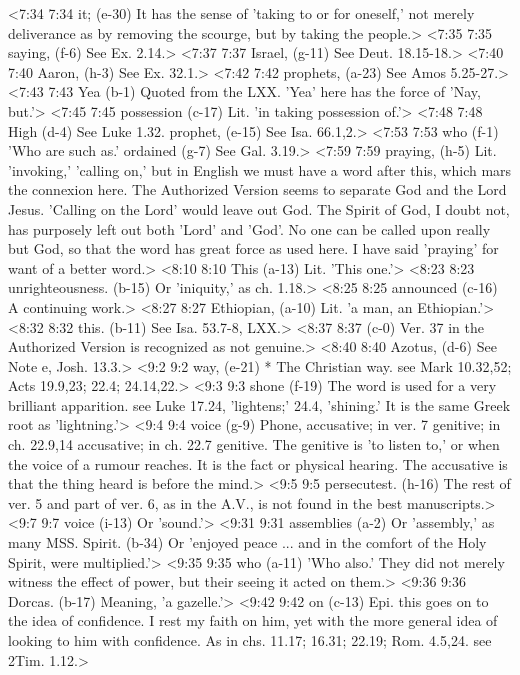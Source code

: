<7:34 7:34  it; (e-30)  It has the sense of 'taking to or for oneself,' not merely  deliverance as by removing the scourge, but by taking the  people.>
<7:35 7:35  saying, (f-6)  See Ex. 2.14.>
<7:37 7:37  Israel, (g-11)  See Deut. 18.15-18.>
<7:40 7:40  Aaron, (h-3)  See Ex. 32.1.>
<7:42 7:42  prophets, (a-23)  See Amos 5.25-27.>
<7:43 7:43  Yea  (b-1)  Quoted from the LXX. 'Yea' here has the force of 'Nay, but.'>
<7:45 7:45  possession (c-17)  Lit. 'in taking possession of.'>
<7:48 7:48  High (d-4)  See Luke 1.32.
  prophet, (e-15)  See Isa. 66.1,2.>
<7:53 7:53  who (f-1)  'Who are such as.'
  ordained (g-7)  See Gal. 3.19.>
<7:59 7:59  praying, (h-5)  Lit. 'invoking,' 'calling on,' but in English we must have a  word after this, which mars the connexion here. The Authorized  Version seems to separate God and the Lord Jesus. 'Calling on  the Lord' would leave out God. The Spirit of God, I doubt not,  has purposely left out both 'Lord' and 'God'. No one can be  called upon really but God, so that the word has great force as  used here. I have said 'praying' for want of a better word.>
<8:10 8:10  This (a-13)  Lit. 'This one.'>
<8:23 8:23  unrighteousness. (b-15)  Or 'iniquity,' as ch. 1.18.>
<8:25 8:25  announced (c-16)  A continuing work.>
<8:27 8:27  Ethiopian, (a-10)  Lit. 'a man, an Ethiopian.'>
<8:32 8:32  this. (b-11)  See Isa. 53.7-8, LXX.>
<8:37 8:37   (c-0)  Ver. 37 in the Authorized Version is recognized as not  genuine.>
<8:40 8:40  Azotus, (d-6)  See Note e, Josh. 13.3.>
<9:2 9:2  way, (e-21)  * The Christian way. see Mark 10.32,52; Acts 19.9,23; 22.4; 24.14,22.>
<9:3 9:3  shone (f-19)  The word is used for a very brilliant apparition. see Luke  17.24, 'lightens;' 24.4, 'shining.' It is the same Greek root  as 'lightning.'>
<9:4 9:4  voice (g-9)  Phone, accusative; in ver. 7 genitive; in ch. 22.9,14  accusative; in ch. 22.7 genitive. The genitive is 'to listen  to,' or when the voice of a rumour reaches. It is the fact or  physical hearing. The accusative is that the thing heard is  before the mind.>
<9:5 9:5  persecutest. (h-16)  The rest of ver. 5 and part of ver. 6, as in the A.V., is not  found in the best manuscripts.>
<9:7 9:7  voice (i-13)  Or 'sound.'>
<9:31 9:31  assemblies (a-2)  Or 'assembly,' as many MSS.
  Spirit. (b-34)  Or 'enjoyed peace ... and in the comfort of the Holy Spirit,  were multiplied.'>
<9:35 9:35  who (a-11)  'Who also.' They did not merely witness the effect of power,  but their seeing it acted on them.>
<9:36 9:36  Dorcas. (b-17)  Meaning, 'a gazelle.'>
<9:42 9:42  on (c-13)  Epi. this goes on to the idea of confidence. I rest my  faith on him, yet with the more general idea of looking to him  with confidence. As in chs. 11.17; 16.31; 22.19; Rom. 4.5,24.  see 2Tim. 1.12.>

